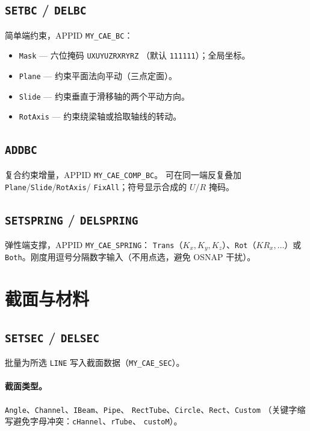 \documentclass[a4paper]{ltxdoc}
\newcommand{\cadcmd}[1]{\texttt{\textbf{#1}}}
\newcommand{\appid}[1]{\texttt{#1}}
\begin{document}
\subsection{\cadcmd{SETBC} / \cadcmd{DELBC}}
简单端约束，APPID \appid{MY\_CAE\_BC}：
\begin{itemize}[nosep]
  \item \texttt{Mask} --- 六位掩码 \texttt{UXUYUZRXRYRZ}
        （默认 \texttt{111111}）；全局坐标。
  \item \texttt{Plane} --- 约束平面法向平动（三点定面）。
  \item \texttt{Slide} --- 约束垂直于滑移轴的两个平动方向。
  \item \texttt{RotAxis} --- 约束绕梁轴或拾取轴线的转动。
\end{itemize}

\subsection{\cadcmd{ADDBC}}
复合约束增量，APPID \appid{MY\_CAE\_COMP\_BC}。
可在同一端反复叠加 \texttt{Plane}/\texttt{Slide}/\texttt{RotAxis}/
\texttt{FixAll}；符号显示合成的 $U$/$R$ 掩码。

\subsection{\cadcmd{SETSPRING} / \cadcmd{DELSPRING}}
弹性端支撑，APPID \appid{MY\_CAE\_SPRING}：
\texttt{Trans}（$K_x,K_y,K_z$）、\texttt{Rot}（$KR_x,\ldots$）或
\texttt{Both}。刚度用逗号分隔数字输入（不用点选，避免 OSNAP 干扰）。

\section{截面与材料}

\subsection{\cadcmd{SETSEC} / \cadcmd{DELSEC}}
批量为所选 \texttt{LINE} 写入截面数据（\appid{MY\_CAE\_SEC}）。

\paragraph{截面类型。}
\texttt{Angle}、\texttt{Channel}、\texttt{IBeam}、\texttt{Pipe}、
\texttt{RectTube}、\texttt{Circle}、\texttt{Rect}、\texttt{Custom}
（关键字缩写避免字母冲突：\texttt{cHannel}、\texttt{rTube}、
\texttt{custoM}）。
\end{document}
